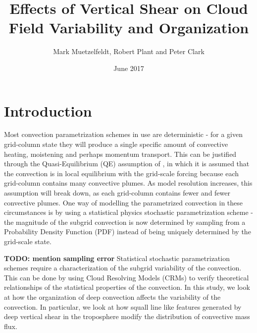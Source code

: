 \documentclass[11pt,a4paper]{article}
\title{Effects of Vertical Shear on Cloud Field Variability and Organization }
\author{Mark Muetzelfeldt, Robert Plant and  Peter Clark}
\date{June 2017}
\newcommand\todo[1]{\textbf{TODO: #1}}
\begin{document}
\maketitle
\section{Introduction}

Most convection parametrization schemes in use are deterministic - for a given grid-column state they will produce a single specific amount of convective heating, moistening and perhaps momentum transport. This can be justified through the Quasi-Equilibrium (QE) assumption of \cite{arakawa1974interaction}, in which it is assumed that the convection is in local equilibrium with the grid-scale forcing because each grid-column contains many convective plumes. As model resolution increases, this assumption will break down, as each grid-column contains fewer and fewer convective plumes. One way of modelling the parametrized convection in these circumstances is by using a statistical physics stochastic parametrization scheme \parencite{berner2017stochastic} - the magnitude of the subgrid convection is now determined by sampling from a Probability Density Function (PDF) instead of being uniquely determined by the grid-scale state.

\todo{mention sampling error}
Statistical stochastic parametrization schemes require a characterization of the subgrid variability of the convection. This can be done by using Cloud Resolving Models (CRMs) to verify theoretical relationships of the statistical properties of the convection. In this study, we look at how the organization of deep convection affects the variability of the convection. In particular, we look at how squall line like features generated by deep vertical shear in the troposphere modify the distribution of convective mass flux.

\end{document}
